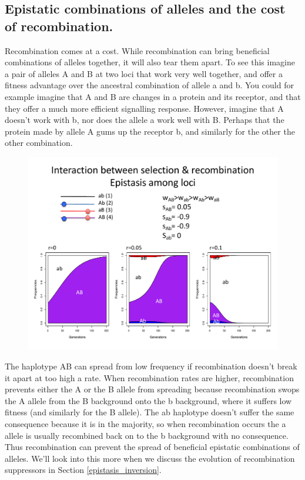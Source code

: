 \subsection{Epistatic combinations of alleles and the cost of recombination.}
Recombination comes at a cost. While recombination can bring beneficial combinations of alleles together, it will also tear them apart. To see this imagine a pair of alleles A and B at two loci that work very well together, and offer a fitness advantage over the ancestral combination of allele a and b. You could for example imagine that A and B are changes in a protein and its receptor, and that they offer a much more efficient signalling response. However, imagine that A doesn't work with b, nor does the allele a work well with B. Perhaps that the protein made by allele A gums up the receptor b, and similarly for the other the other combination.
\begin{figure}
\begin{center}
  \includegraphics[width = \textwidth]{figures/Epistasis_vs_recom.pdf}
\end{center}
\caption{} \label{fig Epistasis_vs_recom}  
\end{figure}

The haplotype AB can spread from low frequency if recombination doesn't break it apart at too high a rate. When recombination rates are higher, recombination prevents either the A or the B allele from spreading because recombination swops the A allele from the B background onto the b background, where it suffers low fitness (and similarly for the B allele). The ab haplotype doesn't suffer the same consequence because it is in the majority, so when recombination occurs the a allele is usually recombined back on to the b background with no consequence. Thus recombination can prevent the spread of beneficial epistatic combinations of alleles. We'll look into this more when we discuss the evolution of recombination suppressors in Section \ref{epistasis_inversion}.

